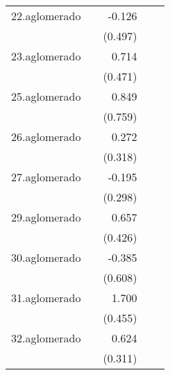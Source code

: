 {\begin{longtable}{l*{4}{D{.}{.}{-1}}}
\addlinespace
22.aglomerado&                     &      -0.126         &                     &                     \\
            &                     &     (0.497)         &                     &                     \\
\addlinespace
23.aglomerado&                     &       0.714         &                     &                     \\
            &                     &     (0.471)         &                     &                     \\
\addlinespace
25.aglomerado&                     &       0.849         &                     &                     \\
            &                     &     (0.759)         &                     &                     \\
\addlinespace
26.aglomerado&                     &       0.272         &                     &                     \\
            &                     &     (0.318)         &                     &                     \\
\addlinespace
27.aglomerado&                     &      -0.195         &                     &                     \\
            &                     &     (0.298)         &                     &                     \\
\addlinespace
29.aglomerado&                     &       0.657         &                     &                     \\
            &                     &     (0.426)         &                     &                     \\
\addlinespace
30.aglomerado&                     &      -0.385         &                     &                     \\
            &                     &     (0.608)         &                     &                     \\
\addlinespace
31.aglomerado&                     &       1.700\sym{***}&                     &                     \\
            &                     &     (0.455)         &                     &                     \\
\addlinespace
32.aglomerado&                     &       0.624\sym{*}  &                     &                     \\
            &                     &     (0.311)         &                     &                     \\

\end{longtable}}

